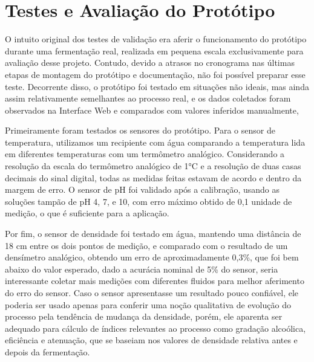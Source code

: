 \chapter{Testes e Avaliação do Protótipo}

O intuito original dos testes de validação era aferir o funcionamento do protótipo durante uma fermentação real, 
realizada em pequena escala exclusivamente para avaliação desse projeto. Contudo, devido a atrasos no cronograma
nas últimas etapas de montagem do protótipo e documentação, não foi possível preparar esse teste. Decorrente disso,
o protótipo foi testado em situações não ideais, mas ainda assim relativamente semelhantes ao processo real, e os
dados coletados foram observados na Interface Web e comparados com valores inferidos manualmente, 


Primeiramente foram testados os sensores do protótipo. Para o sensor de temperatura, utilizamos um recipiente com água
comparando a temperatura lida em diferentes temperaturas com um termômetro analógico. Considerando a resolução da escala do
termômetro analógico de 1°C e a resolução de duas casas decimais do sinal digital, todas as medidas feitas estavam de acordo
e dentro da margem de erro. O sensor de pH foi validado após a calibração, usando as soluções tampão de pH 4, 7, e 10, com erro
máximo obtido de 0,1 unidade de medição, o que é suficiente para a aplicação. 

Por fim, o sensor de densidade foi testado em água,
mantendo uma distância de 18 cm entre os dois pontos de medição, e comparado com o resultado de um densímetro analógico,
obtendo um erro de aproximadamente 0,3\%, que foi bem abaixo do valor esperado, dado a acurácia nominal de 5\% do sensor, 
seria interessante coletar mais medições com diferentes fluidos para melhor aferimento do erro do sensor. Caso o sensor apresentasse
um resultado pouco confiável, ele poderia ser usado apenas para conferir uma noção qualitativa de evolução do processo pela 
tendência de mudança da densidade, porém, ele aparenta ser adequado para cálculo de índices relevantes ao processo como 
gradação alcoólica, eficiência e atenuação, que se baseiam nos valores de densidade relativa antes e depois da fermentação.

